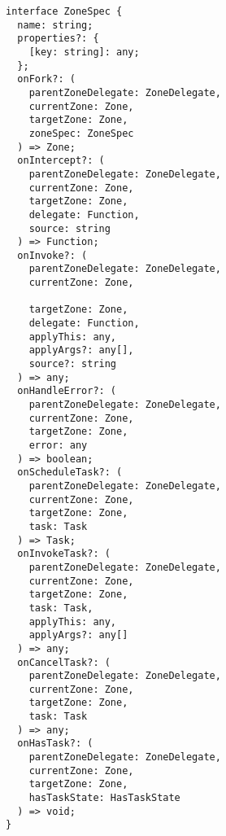 \begin{verbatim}
interface ZoneSpec {
  name: string;
  properties?: {
    [key: string]: any;
  };
  onFork?: (
    parentZoneDelegate: ZoneDelegate,
    currentZone: Zone,
    targetZone: Zone,
    zoneSpec: ZoneSpec
  ) => Zone;
  onIntercept?: (
    parentZoneDelegate: ZoneDelegate,
    currentZone: Zone,
    targetZone: Zone,
    delegate: Function,
    source: string
  ) => Function;
  onInvoke?: (
    parentZoneDelegate: ZoneDelegate,
    currentZone: Zone,

    targetZone: Zone,
    delegate: Function,
    applyThis: any,
    applyArgs?: any[],
    source?: string
  ) => any;
  onHandleError?: (
    parentZoneDelegate: ZoneDelegate,
    currentZone: Zone,
    targetZone: Zone,
    error: any
  ) => boolean;
  onScheduleTask?: (
    parentZoneDelegate: ZoneDelegate,
    currentZone: Zone,
    targetZone: Zone,
    task: Task
  ) => Task;
  onInvokeTask?: (
    parentZoneDelegate: ZoneDelegate,
    currentZone: Zone,
    targetZone: Zone,
    task: Task,
    applyThis: any,
    applyArgs?: any[]
  ) => any;
  onCancelTask?: (
    parentZoneDelegate: ZoneDelegate,
    currentZone: Zone,
    targetZone: Zone,
    task: Task
  ) => any;
  onHasTask?: (
    parentZoneDelegate: ZoneDelegate,
    currentZone: Zone,
    targetZone: Zone,
    hasTaskState: HasTaskState
  ) => void;
}
\end{verbatim}
